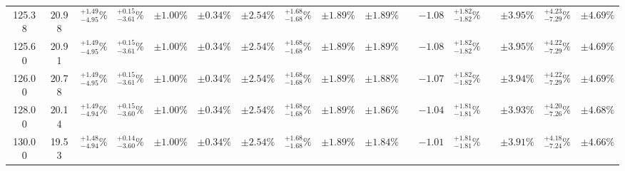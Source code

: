 \begin{landscape}
\begin{table}[ht!]
{\begin{tabular}{| cc | cccc | ccc | c |@{}c@{\;}| cc |@{}c@{\;}| ccc |}
125.38 & 20.98 & \({}^{ +1.49}_{ -4.95}\%\) & {\color{black!55}\({}^{ +0.15}_{ -3.61}\%\)} & {\color{black!55}\(\pm{  1.00}\%\)} & {\color{black!55}\(\pm{  0.34}\%\)} & \(\pm 2.54\%\) & {\color{black!55}\({}^{ +1.68}_{ -1.68}\%\)} & {\color{black!55}\(\pm 1.89\%\)} & \(\pm{  1.89}\%\) &  & \(-1.08\) & \({}^{ +1.82}_{ -1.82}\%\) &  & \(\pm 3.95\%\) & \({}^{ +4.23}_{ -7.29}\%\) & \(\pm 4.69\%\)\\
125.60 & 20.91 & \({}^{ +1.49}_{ -4.95}\%\) & {\color{black!55}\({}^{ +0.15}_{ -3.61}\%\)} & {\color{black!55}\(\pm{  1.00}\%\)} & {\color{black!55}\(\pm{  0.34}\%\)} & \(\pm 2.54\%\) & {\color{black!55}\({}^{ +1.68}_{ -1.68}\%\)} & {\color{black!55}\(\pm 1.89\%\)} & \(\pm{  1.89}\%\) &  & \(-1.08\) & \({}^{ +1.82}_{ -1.82}\%\) &  & \(\pm 3.95\%\) & \({}^{ +4.22}_{ -7.29}\%\) & \(\pm 4.69\%\)\\
126.00 & 20.78 & \({}^{ +1.49}_{ -4.95}\%\) & {\color{black!55}\({}^{ +0.15}_{ -3.61}\%\)} & {\color{black!55}\(\pm{  1.00}\%\)} & {\color{black!55}\(\pm{  0.34}\%\)} & \(\pm 2.54\%\) & {\color{black!55}\({}^{ +1.68}_{ -1.68}\%\)} & {\color{black!55}\(\pm 1.89\%\)} & \(\pm{  1.88}\%\) &  & \(-1.07\) & \({}^{ +1.82}_{ -1.82}\%\) &  & \(\pm 3.94\%\) & \({}^{ +4.22}_{ -7.29}\%\) & \(\pm 4.69\%\)\\
128.00 & 20.14 & \({}^{ +1.49}_{ -4.94}\%\) & {\color{black!55}\({}^{ +0.15}_{ -3.60}\%\)} & {\color{black!55}\(\pm{  1.00}\%\)} & {\color{black!55}\(\pm{  0.34}\%\)} & \(\pm 2.54\%\) & {\color{black!55}\({}^{ +1.68}_{ -1.68}\%\)} & {\color{black!55}\(\pm 1.89\%\)} & \(\pm{  1.86}\%\) &  & \(-1.04\) & \({}^{ +1.81}_{ -1.81}\%\) &  & \(\pm 3.93\%\) & \({}^{ +4.20}_{ -7.26}\%\) & \(\pm 4.68\%\)\\
130.00 & 19.53 & \({}^{ +1.48}_{ -4.94}\%\) & {\color{black!55}\({}^{ +0.14}_{ -3.60}\%\)} & {\color{black!55}\(\pm{  1.00}\%\)} & {\color{black!55}\(\pm{  0.34}\%\)} & \(\pm 2.54\%\) & {\color{black!55}\({}^{ +1.68}_{ -1.68}\%\)} & {\color{black!55}\(\pm 1.89\%\)} & \(\pm{  1.84}\%\) &  & \(-1.01\) & \({}^{ +1.81}_{ -1.81}\%\) &  & \(\pm 3.91\%\) & \({}^{ +4.18}_{ -7.24}\%\) & \(\pm 4.66\%\)\\
\cline{1-10} \cline{12-13} \cline{15-17}
\end{tabular}
}
\end{table}


\end{landscape}
